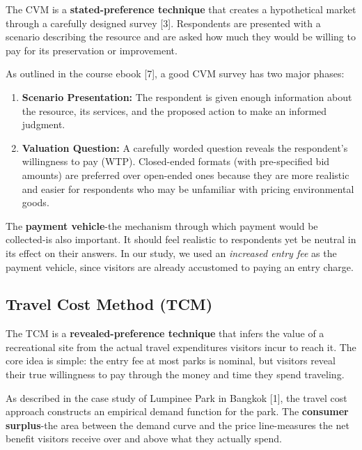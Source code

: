 \documentclass[12pt, a4paper]{article}
\begin{document}
The CVM is a \textbf{stated-preference technique} that creates a hypothetical market through a carefully designed survey [3]. Respondents are presented with a scenario describing the resource and are asked how much they would be willing to pay for its preservation or improvement.

As outlined in the course ebook [7], a good CVM survey has two major phases:
\begin{enumerate}[nosep]
    \item \textbf{Scenario Presentation:} The respondent is given enough information about the resource, its services, and the proposed action to make an informed judgment.
    \item \textbf{Valuation Question:} A carefully worded question reveals the respondent's willingness to pay (WTP). Closed-ended formats (with pre-specified bid amounts) are preferred over open-ended ones because they are more realistic and easier for respondents who may be unfamiliar with pricing environmental goods.
\end{enumerate}

The \textbf{payment vehicle}-the mechanism through which payment would be collected-is also important. It should feel realistic to respondents yet be neutral in its effect on their answers. In our study, we used an \textit{increased entry fee} as the payment vehicle, since visitors are already accustomed to paying an entry charge.

\subsection{Travel Cost Method (TCM)}

The TCM is a \textbf{revealed-preference technique} that infers the value of a recreational site from the actual travel expenditures visitors incur to reach it. The core idea is simple: the entry fee at most parks is nominal, but visitors reveal their true willingness to pay through the money and time they spend traveling.

As described in the case study of Lumpinee Park in Bangkok [1], the travel cost approach constructs an empirical demand function for the park. The \textbf{consumer surplus}-the area between the demand curve and the price line-measures the net benefit visitors receive over and above what they actually spend.

\end{document}
